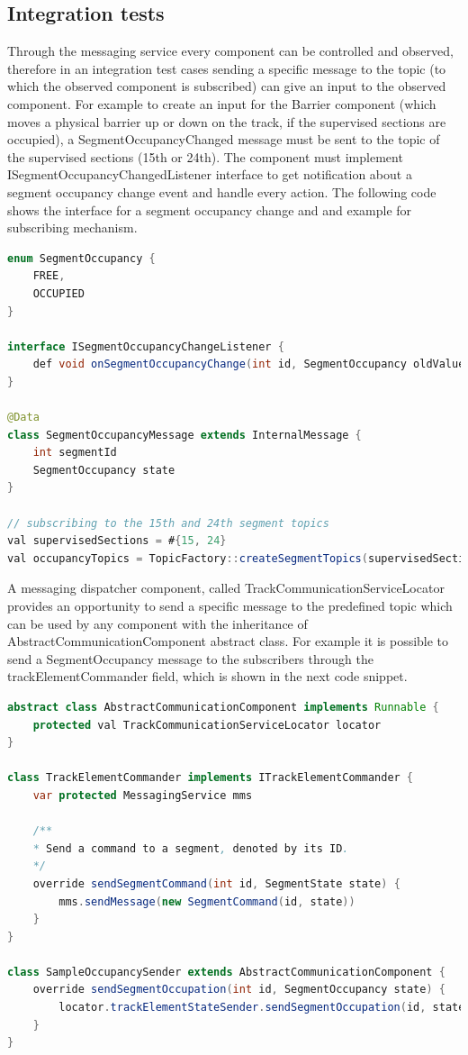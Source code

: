 \subsection{Integration tests}
Through the messaging service every component can be controlled and observed, therefore in an integration test cases sending a specific message to the topic (to which the observed component is subscribed) can give an input to the observed component. For example to create an input for the Barrier component (which moves a physical barrier up or down on the track, if the supervised sections are occupied), a SegmentOccupancyChanged message must be sent to the topic of the supervised sections (15th or 24th). The component must implement ISegmentOccupancyChangedListener interface to get notification about a segment occupancy change event and handle every action. The following code shows the interface for a segment occupancy change and and example for subscribing mechanism.

\begin{lstlisting}[language = Java]
enum SegmentOccupancy {
	FREE,
	OCCUPIED
}

interface ISegmentOccupancyChangeListener {
	def void onSegmentOccupancyChange(int id, SegmentOccupancy oldValue, SegmentOccupancy newValue)
}

@Data
class SegmentOccupancyMessage extends InternalMessage {
	int segmentId
	SegmentOccupancy state
}

// subscribing to the 15th and 24th segment topics
val supervisedSections = #{15, 24}
val occupancyTopics = TopicFactory::createSegmentTopics(supervisedSections, #{SegmentOccupancyMessage}).toSet
\end{lstlisting}

A messaging dispatcher component, called TrackCommunicationServiceLocator provides an opportunity to send a specific message to the predefined topic which can be used by any component with the inheritance of AbstractCommunicationComponent abstract class. For example it is possible to send a SegmentOccupancy message to the subscribers through the trackElementCommander field, which is shown in the next code snippet.

\begin{lstlisting}[language = Java]
abstract class AbstractCommunicationComponent implements Runnable {
	protected val TrackCommunicationServiceLocator locator
}

class TrackElementCommander implements ITrackElementCommander {
	var protected MessagingService mms
	
	/**
	* Send a command to a segment, denoted by its ID.
	*/
	override sendSegmentCommand(int id, SegmentState state) {
		mms.sendMessage(new SegmentCommand(id, state))
	}
}

class SampleOccupancySender extends AbstractCommunicationComponent {
	override sendSegmentOccupation(int id, SegmentOccupancy state) {
		locator.trackElementStateSender.sendSegmentOccupation(id, state)
	}
}
\end{lstlisting}

